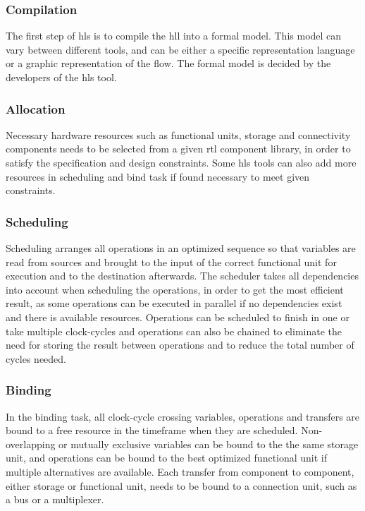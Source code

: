 \subsubsection{Compilation}

The first step of \gls{hls} is to compile the \gls{hll} into a formal model. This model can vary between different tools, and can be either a specific representation language or a graphic representation of the flow. The formal model is decided by the developers of the \gls{hls} tool. 

\subsubsection{Allocation}

Necessary hardware resources such as functional units, storage and connectivity components needs to be selected from a given \gls{rtl} component library, in order to satisfy the specification and design constraints. Some \gls{hls} tools can also add more resources in scheduling and bind task if found necessary to meet given constraints.

\subsubsection{Scheduling}
Scheduling arranges all operations in an optimized sequence so that variables are read from sources and brought to the input of the correct functional unit for execution and to the destination afterwards. The scheduler takes all dependencies into account when scheduling the operations, in order to get the most efficient result, as some operations can be executed in parallel if no dependencies exist and there is available resources. Operations can be scheduled to finish in one or take multiple clock-cycles and operations can also be chained to eliminate the need for storing the result between operations and to reduce the total number of cycles needed. 
\subsubsection{Binding}
In the binding task, all clock-cycle crossing variables, operations and transfers are bound to a free resource in the timeframe when they are scheduled. Non-overlapping or mutually exclusive variables can be bound to the the same storage unit, and operations can be bound to the best optimized functional unit if multiple alternatives are available. Each transfer from component to component, either storage or functional unit, needs to be bound to a connection unit, such as a bus or a multiplexer.
